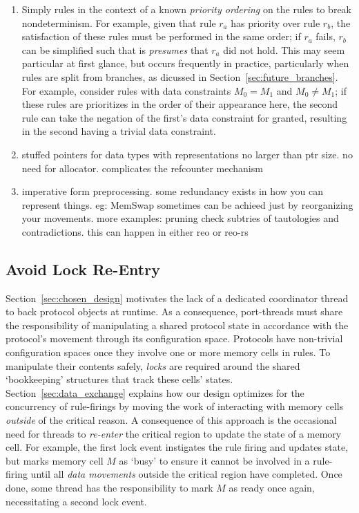 \begin{enumerate}
	\item Simply rules in the context of a known \textit{priority ordering} on the rules to break nondeterminism. For example, given that rule $r_a$ has priority over rule $r_b$, the satisfaction of these rules must be performed in the same order; if $r_a$ fails, $r_b$ can be simplified such that is \textit{presumes} that $r_a$ did not hold. This may seem particular at first glance, but occurs frequently in practice, particularly when rules are split from branches, as dicussed in Section~\ref{sec:future_branches}. For example, consider rules  with data constraints $M_0=M_1$ and $M_0\neq{}M_1$; if these rules are prioritizes in the order of their appearance here, the second rule can take the negation of the first's data constraint for granted, resulting in the second having a trivial data constraint.
	
	\item stuffed pointers for data types with representations no larger than ptr size. no need for allocator. complicates the refcounter mechanism
	\item imperative form preprocessing. some redundancy exists in how you can represent things. eg: MemSwap sometimes can be achieed just by reorganizing your movements. more examples: pruning check subtries of tautologies and contradictions. this can happen in either reo or reo-rs
\end{enumerate}
\subsection{Avoid Lock Re-Entry}
Section~\ref{sec:chosen_design} motivates the lack of a dedicated coordinator thread to back protocol objects at runtime. As a consequence, port-threads must share the responsibility of manipulating a shared protocol state in accordance with the protocol's movement through its configuration space. Protocols have non-trivial configuration spaces once they involve one or more memory cells in rules. To manipulate their contents safely, \textit{locks} are required around the shared `bookkeeping' structures that track these cells' states. Section~\ref{sec:data_exchange} explains how our design optimizes for the concurrency of rule-firings by moving the work of interacting with memory cells \textit{outside} of the critical reason. A consequence of this approach is the occasional need for threads to \textit{re-enter} the critical region to update the state of a memory cell. For example, the first lock event instigates the rule firing and updates state, but marks memory cell $M$ as `busy' to ensure it cannot be involved in a rule-firing until all \textit{data movements} outside the critical region have completed. Once done, some thread has the responsibility to mark $M$ as ready once again, necessitating a second lock event.


